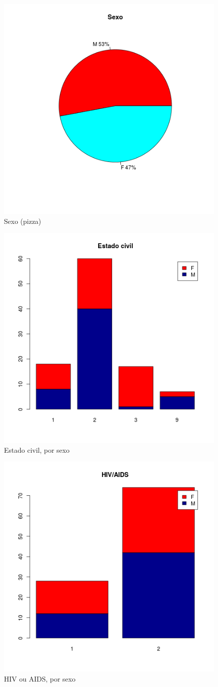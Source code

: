 \documentclass[a4paper]{article}
\begin{document}
\begin{figure}[!h]
  \centering
  \includegraphics[width=.5\textwidth]{../figuras/sexo-pizza-pct}
  \caption{Sexo (pizza)}
  \label{fig:}
\end{figure}

\begin{figure}[!h]
  \centering
  \includegraphics[width=.5\textwidth]{../figuras/est_civ-barplot}
  \caption{Estado civil, por sexo}
  \label{fig:est_civ-barplot}
\end{figure}

\begin{figure}[!h]
  \centering
  \includegraphics[width=.5\textwidth]{../figuras/hiv_aids-barplot}
  \caption{HIV ou AIDS, por sexo}
  \label{fig:}
\end{figure}
\end{document}
